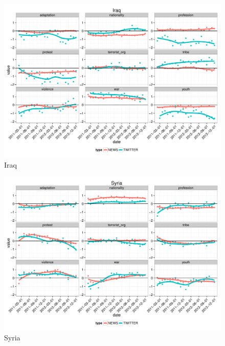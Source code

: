 \begin{figure}
	\centering
	\includegraphics[width=\textwidth]{imgs/iraq.pdf}
	\caption{Iraq}
	\label{fig:iraq}
\end{figure}


\begin{figure}
	\centering
	\includegraphics[width=\textwidth]{imgs/syria.pdf}
	\caption{Syria}
	\label{fig:syria}
\end{figure}
